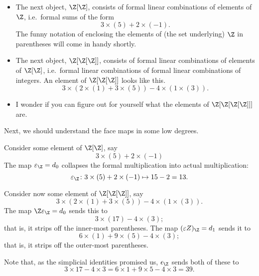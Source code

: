 \documentclass[main.tex]{subfiles}
\begin{document}
\begin{example}
\begin{itemize}
    \item The next object, $\Z[\Z]$, consists of formal linear combinations of elements of $\Z$, i.e.\ formal sums of the form
      \begin{equation*}
        3\times(5) + 2\times(-1).
      \end{equation*}
      The funny notation of enclosing the elements of (the set underlying) $\Z$ in parentheses will come in handy shortly.

    \item The next object, $\Z[\Z[\Z]]$, consists of formal linear combinations of elements of $\Z[\Z]$, i.e.\ formal linear combinations of formal linear combinations of integers. An element of $\Z[\Z[\Z]]$ looks like this.
      \begin{equation*}
        3\times(2\times(1) + 3\times(5)) - 4\times(1\times(3)).
      \end{equation*}

    \item I wonder if you can figure out for yourself what the elements of $\Z[\Z[\Z[\Z]]]$ are.
  \end{itemize}

  Next, we should understand the face maps in some low degrees.

  Consider some element of $\Z[\Z]$, say
  \begin{equation*}
    3\times(5) + 2\times(-1)
  \end{equation*}
  The map $\varepsilon_{\Z} = d_{0}$ collapses the formal multiplication into actual multiplication:
  \begin{equation*}
    \varepsilon_{\Z}\colon 3\times(5) + 2\times(-1) \mapsto 15 - 2 = 13.
  \end{equation*}

  Consider now some element of $\Z[\Z[\Z]]$, say
  \begin{equation*}
    3\times(2\times(1) + 3\times(5)) - 4\times(1\times(3)).
  \end{equation*}
  The map $\Z\varepsilon_{\Z} = d_{0}$ sends this to
  \begin{equation*}
    3\times(17) - 4\times(3);
  \end{equation*}
  that is, it strips off the inner-most parentheses. The map $(\varepsilon Z)_{\Z} = d_{1}$ sends it to
  \begin{equation*}
    6\times(1) + 9\times(5) - 4\times(3);
  \end{equation*}
  that is, it strips off the outer-most parentheses.

  Note that, as the simplicial identities promised us, $\epsilon_{\Z}$ sends both of these to
  \begin{equation*}
    3\times 17 - 4\times 3 = 6\times 1 + 9\times5 - 4\times3 = 39.
  \end{equation*}
\end{example}
\end{document}
